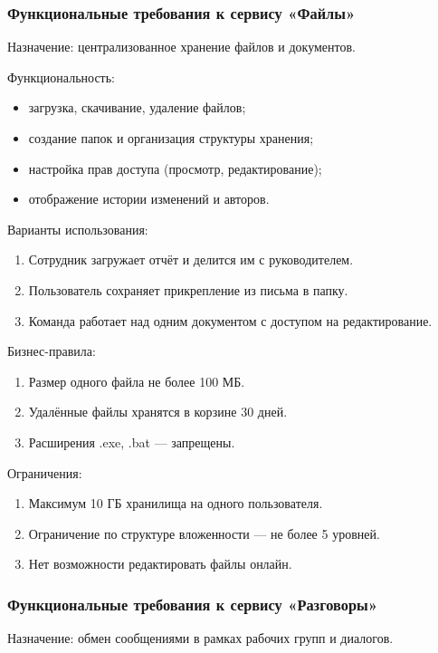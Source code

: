 \subsubsection{Функциональные требования к сервису «Файлы»}

Назначение: централизованное хранение файлов и документов.

Функциональность:
\begin{itemize}
  \item загрузка, скачивание, удаление файлов;
  \item создание папок и организация структуры хранения;
  \item настройка прав доступа (просмотр, редактирование);
  \item отображение истории изменений и авторов.
\end{itemize}

Варианты использования:
\begin{enumerate}
  \item Сотрудник загружает отчёт и делится им с руководителем.
  \item Пользователь сохраняет прикрепление из письма в папку.
  \item Команда работает над одним документом с доступом на редактирование.
\end{enumerate}

Бизнес-правила:
\begin{enumerate}
  \item Размер одного файла не более 100 МБ.
  \item Удалённые файлы хранятся в корзине 30 дней.
  \item Расширения .exe, .bat — запрещены.
\end{enumerate}

Ограничения:
\begin{enumerate}
  \item Максимум 10 ГБ хранилища на одного пользователя.
  \item Ограничение по структуре вложенности — не более 5 уровней.
  \item Нет возможности редактировать файлы онлайн.
\end{enumerate}

\subsubsection{Функциональные требования к сервису «Разговоры»}

Назначение: обмен сообщениями в рамках рабочих групп и диалогов.

